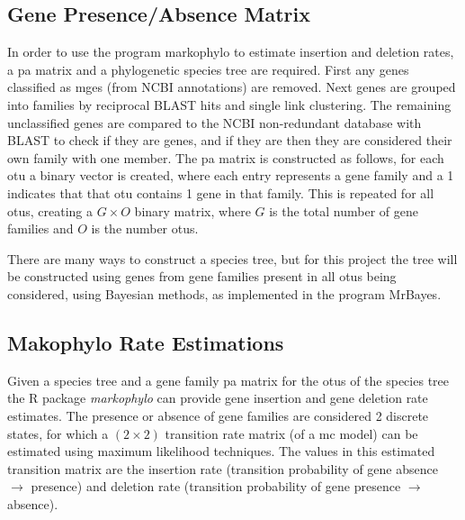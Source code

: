 \documentclass[12pt,letter]{article}
\begin{document}
\subsection*{Gene Presence/Absence Matrix}
In order to use the program markophylo to estimate insertion and deletion rates, a \ac{pa} matrix and a phylogenetic species tree are required.
First any genes classified as \ac{mge}s (from NCBI annotations) are removed.
Next genes are grouped into families by reciprocal BLAST hits and single link clustering.
The remaining unclassified genes are compared to the NCBI non-redundant database with BLAST to check if they are genes, and if they are then they are considered their own family with one member.
The \ac{pa} matrix is constructed as follows, for each \ac{otu} a binary vector is created, where each entry represents a gene family and a 1 indicates that that \ac{otu} contains 1 gene in that family.
This is repeated for all \ac{otu}s, creating a $G \times O$ binary matrix, where $G$ is the total number of gene families and $O$ is the number \ac{otu}s.\par
There are many ways to construct a species tree, but for this project the tree will be constructed using genes from gene families present in all \ac{otu}s being considered, using Bayesian methods, as implemented in the program MrBayes.
\subsection*{Makophylo Rate Estimations}
Given a species tree and a gene family \ac{pa} matrix for the \ac{otu}s of the species tree the R package \textit{markophylo} can provide gene insertion and gene deletion rate estimates\citep{marko}.
The presence or absence of gene families are considered 2 discrete states, for which a $(2\times 2)$ transition rate matrix (of a \ac{mc} model) can be estimated using maximum likelihood techniques.
The values in this estimated transition matrix are the insertion rate (transition probability of gene absence $\to$ presence) and deletion rate (transition probability of gene presence $\to$ absence)\citep{marko}.
\end{document}
